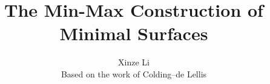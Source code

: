 \title{The Min-Max Construction of Minimal Surfaces}
\author{Xinze Li\\[0.3em]\small Based on the work of Colding--de Lellis}

\maketitle
\tableofcontents








